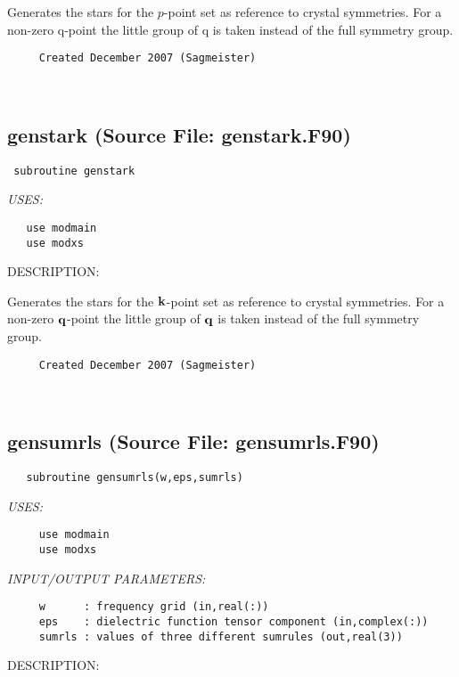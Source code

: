 \documentclass[11pt]{article}
\begin{document}
     Generates the stars for the $p$-point set as reference to crystal
     symmetries. For a non-zero q-point the little group of q is taken
     instead of the full symmetry group.
  
\begin{verbatim}     Created December 2007 (Sagmeister)\end{verbatim}


 
 
\mbox{}\hrulefill\ 
 
\subsection{genstark (Source File: genstark.F90)}


\begin{verbatim} subroutine genstark\end{verbatim}{\em USES:}
\begin{verbatim}   use modmain
   use modxs\end{verbatim}
{\sf DESCRIPTION:\\ }


     Generates the stars for the ${\bf k}$-point set as reference to crystal
     symmetries. For a non-zero ${\bf q}$-point the little group of ${\bf q}$
     is taken instead of the full symmetry group.
  
\begin{verbatim}     Created December 2007 (Sagmeister)\end{verbatim}


 
 
\mbox{}\hrulefill\ 
 
\subsection{gensumrls (Source File: gensumrls.F90)}


\begin{verbatim}   subroutine gensumrls(w,eps,sumrls)\end{verbatim}{\em USES:}
\begin{verbatim}     use modmain
     use modxs\end{verbatim}{\em INPUT/OUTPUT PARAMETERS:}
\begin{verbatim}     w      : frequency grid (in,real(:))
     eps    : dielectric function tensor component (in,complex(:))
     sumrls : values of three different sumrules (out,real(3))\end{verbatim}
{\sf DESCRIPTION:\\ }
\end{document}
